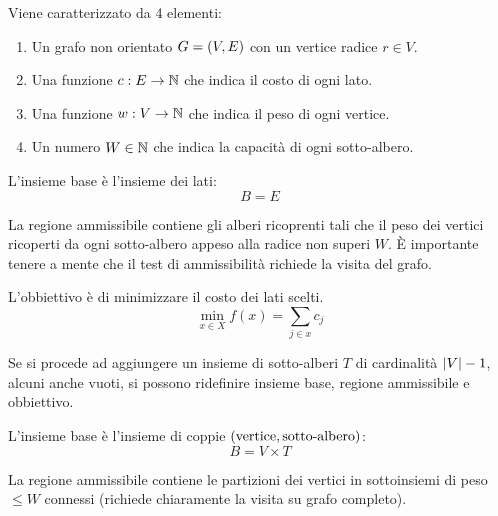 \documentclass[\main/main.tex]{subfiles}
\begin{document}
\begin{multicols}{2}
\begin{problem}
        Viene caratterizzato da 4 elementi:
        \begin{enumerate}
            \item Un grafo non orientato \(G = \left(V, E\right)\) con un vertice radice \(r \in V\).
            \item Una funzione \(c: E \rightarrow \mathbb{N} \) che indica il costo di ogni lato.
            \item Una funzione \(w: V \rightarrow \mathbb{N}\) che indica il peso di ogni vertice.
            \item Un numero \(W \in \mathbb{N}\) che indica la capacità di ogni sotto-albero.
        \end{enumerate}    
    \end{problem}
    \begin{definition}
        L'insieme base è l'insieme dei lati:
        \[
            B = E
        \]
    \end{definition}
    \begin{definition}
        La regione ammissibile contiene gli alberi ricoprenti tali che il peso dei vertici ricoperti da ogni sotto-albero appeso alla radice non superi \(W\). È importante tenere a mente che il test di ammissibilità richiede la visita del grafo.
    \end{definition}
    \begin{definition}
        L'obbiettivo è di minimizzare il costo dei lati scelti.
        \[
            \min_{x \in X} f(x) = \sum_{j \in x} c_j
        \]
    \end{definition}
    \begin{observation}
        Se si procede ad aggiungere un insieme di sotto-alberi \(T\) di cardinalità \(\left\lvert V\right\rvert - 1\), alcuni anche vuoti, si possono ridefinire insieme base, regione ammissibile e obbiettivo.
    \end{observation}
    \begin{definition}
        L'insieme base è l'insieme di coppie \(\left(\text{vertice}, \text{sotto-albero}\right)\):
        \[
            B = V \times T
        \]
    \end{definition}
    \begin{definition}
        La regione ammissibile contiene le partizioni dei vertici in sottoinsiemi di peso \(\leq W\) connessi (richiede chiaramente la visita su grafo completo).

\end{definition}
\end{multicols}
\end{document}
